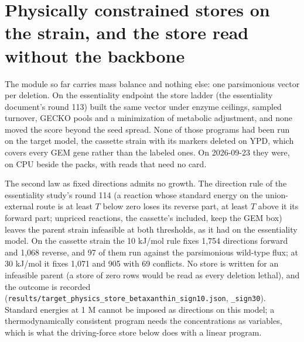 \section{Physically constrained stores on the strain, and the store read without the backbone}
\label{sec:physics}

The module so far carries mass balance and nothing else: one parsimonious vector per
deletion. On the essentiality endpoint the store ladder (the essentiality document's
round 113) built the same vector under enzyme ceilings, sampled turnover, GECKO pools
and a minimization of metabolic adjustment, and none moved the score beyond the seed
spread. None of those programs had been run on the target model, the cassette strain
with its markers deleted on YPD, which covers every GEM gene rather than the labeled
ones. On 2026-09-23 they were, on CPU beside the packs, with reads that need no card.

The second law as fixed directions admits no growth. The direction rule of the
essentiality study's round 114 (a reaction whose standard energy on the union-external
route is at least $T$ below zero loses its reverse part, at least $T$ above it its
forward part; unpriced reactions, the cassette's included, keep the GEM box) leaves the
parent strain infeasible at both thresholds, as it had on the essentiality model. On the
cassette strain the 10 kJ/mol rule fixes 1,754 directions forward and 1,068 reverse, and
97 of them run against the parsimonious wild-type flux; at 30 kJ/mol it fixes 1,071 and
905 with 69 conflicts. No store is written for an infeasible parent (a store of zero rows
would be read as every deletion lethal), and the outcome is recorded
(\texttt{results/target\_physics\_store\_betaxanthin\_sign10.json}, \texttt{\_sign30}).
Standard energies at 1 M cannot be imposed as directions on this model; a
thermodynamically consistent program needs the concentrations as variables, which is
what the driving-force store below does with a linear program.

